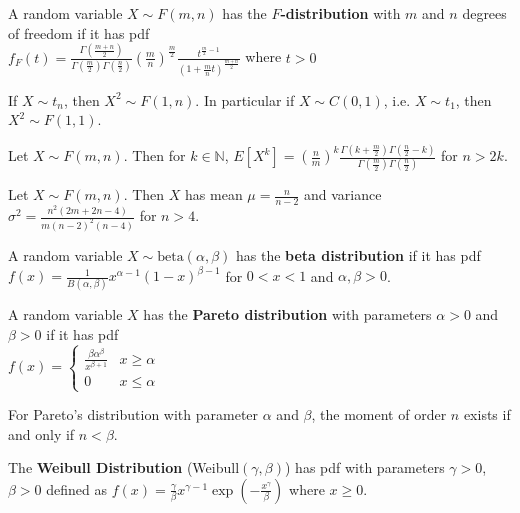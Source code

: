 \begin{defn}
    A random variable $X \sim F(m,n)$ has the \textbf{$F$-distribution} with $m$ and $n$ degrees of freedom if it has pdf \\ 
    $ f_F(t) = \displaystyle \frac{\Gamma\left(\frac{m + n}{2} \right)}{\Gamma\left(\frac{m}{2} \right) \Gamma\left(\frac{n}{2} \right)} \displaystyle \left(\frac{m}{n}\right)^{\frac{m}{2}} \frac{t^{\frac{m}{2} - 1}}{(1 + \frac{m}{n}t)^{\frac{m + n}{2}}} $ where $t > 0$
\end{defn}

\begin{prop}
    If $X \sim t_n$, then $X^2 \sim F(1,n)$. In particular if $X \sim C(0,1)$, i.e. $X \sim t_1$, then $X^2 \sim F(1,1)$.
\end{prop}

\begin{prop}
    Let $X \sim F(m,n)$. Then for $k \in \mathbb{N}$, $E[X^k] =\displaystyle \left(\frac{n}{m}\right)^k \frac{\Gamma(k + \frac{m}{2}) \Gamma(\frac{n}{2} - k)}{\Gamma(\frac{m}{2}) \Gamma(\frac{n}{2})}$ for $n > 2k$.
\end{prop}

\begin{prop}
    Let $X \sim F(m,n)$. Then $X$ has mean $\mu = \displaystyle \frac{n}{n-2}$ and variance $\sigma^2 = \displaystyle \frac{n^2 (2m + 2n - 4)}{m (n-2)^2 (n-4)}$ for $n > 4$.
\end{prop}

\begin{defn}
    A random variable $X \sim \text{beta}(\alpha, \beta)$ has the \textbf{beta distribution} if it has pdf \\
    $ f(x) = \displaystyle \frac{1}{B(\alpha, \beta)} x^{\alpha-1} (1-x)^{\beta - 1}$ for $0 < x < 1$ and $\alpha, \beta > 0$.
\end{defn}

\begin{defn}
    A random variable $X$ has the \textbf{Pareto distribution} with parameters $\alpha > 0$ and $\beta > 0$ if it has pdf \\
    $f(x) = \begin{cases} \displaystyle \frac{\beta \alpha^\beta}{x^{\beta + 1}} & x \geq \alpha \\ 0 & x \leq \alpha \end{cases}$
\end{defn}

\begin{prop}
    For Pareto's distribution with parameter $\alpha$ and $\beta$, the moment of order $n$ exists if and only if $n < \beta$. 
\end{prop}

\begin{defn}
    The \textbf{Weibull Distribution} (Weibull$(\gamma, \beta)$) has pdf with parameters $\gamma > 0$, $\beta > 0$ defined as  $f(x) = \frac{\gamma}{\beta} x^{\gamma - 1} \exp(- \frac{x^\gamma}{\beta})$ where $x \geq 0$.
\end{defn}

\hhrule
